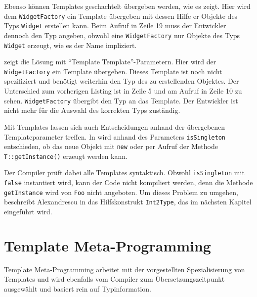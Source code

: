 

Ebenso können Templates geschachtelt übergeben werden, wie es  zeigt. Hier wird dem \texttt{WidgetFactory} ein Template übergeben mit dessen Hilfe er Objekte des Typs \texttt{Widget} erstellen kann. Beim Aufruf in Zeile 19 muss der Entwickler dennoch den Typ angeben, obwohl eine \texttt{WidgetFactory} nur Objekte des Typs \texttt{Widget} erzeugt, wie es der Name impliziert.



 zeigt die Lösung mit \enquote{Template Template}-Parametern. Hier wird der \texttt{WidgetFactory} ein Template übergeben. Dieses Template ist noch nicht spezifiziert und benötigt weiterhin den Typ des zu erstellenden Objektes. Der Unterschied zum vorherigen Listing ist in Zeile 5 und am Aufruf in Zeile 10 zu sehen. \texttt{WidgetFactory} übergibt den Typ an das Template. Der Entwickler ist nicht mehr für die Auswahl des korrekten Typs zuständig.



Mit Templates lassen sich auch Entscheidungen anhand der übergebenen Templateparameter treffen. In  wird anhand des Parameters \texttt{isSingleton} entschieden, ob das neue Objekt mit \texttt{new} oder per Aufruf der Methode \texttt{T::getInstance()} erzeugt werden kann.



Der Compiler prüft dabei alle Templates syntaktisch. Obwohl \texttt{isSingleton} mit \texttt{false} instantiert wird, kann der Code nicht kompiliert werden, denn die Methode \texttt{getInstance} wird von \texttt{Foo} nicht angeboten. Um dieses Problem zu umgehen, beschreibt Alexandrescu in \cite{Alexandrescu2001Modern} das Hilfskonstrukt \texttt{Int2Type}, das im nächsten Kapitel eingeführt wird.

\section{Template Meta-Programming}
Template Meta-Programming arbeitet mit der vorgestellten Spezialisierung von Templates und wird ebenfalls vom Compiler zum Übersetzungszeitpunkt ausgewählt und basiert rein auf Typinformation.

